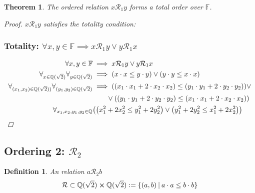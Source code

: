 \documentclass[]{article}
\newcommand{\Rel}{\mathcal{R}}
\newcommand{\N}{\mathbb{N}}
\newcommand{\Q}{\mathbb{Q}}
\newcommand{\st}{ \ \vline \ }
\newtheorem{definition}{Definition}
\newtheorem{theorem}{Theorem}
\begin{document}
\begin{theorem}
    The ordered relation $x \Rel_1 y$ forms a total order over $\mathbb{F}$.
    \begin{proof}
        $x \Rel_1 y$ satisfies the totality condition:
        \subsubsection{Totality: 
        $\forall x,y \in \mathbb{F} \implies x \Rel_1 y \lor y \Rel_1 x$}
        \begin{align*}
            \forall x,y \in \mathbb{F} &\implies x \Rel_1 y \lor y \Rel_1 x\\
            \forall_{x \in \Q(\sqrt{2})}
                    \forall_{y \in \Q(\sqrt{2})}
                &\implies \qty(x \cdot x \leq y \cdot y)
                    \lor \qty(y \cdot y \leq x \cdot x)\\
            \forall_{(x_1,x_2) \in \Q(\sqrt{2}))}
                    \forall_{(y_1,y_2) \in \Q(\sqrt{2})}
                &\implies \qty((x_1 \cdot x_1 + 2 \cdot x_2 \cdot x_2)
                    \leq (y_1 \cdot y_1 + 2 \cdot y_2 \cdot y_2)) \lor\\
                &\qquad \lor \qty((y_1 \cdot y_1 + 2 \cdot y_2 \cdot y_2)
                    \leq (x_1 \cdot x_1 + 2 \cdot x_2 \cdot x_2))\\
            \forall_{x_1, x_2, y_1, y_2 \in \Q}
                &\qty(\qty(x_1^2 + 2 x_2^2 \leq y_1^2 + 2 y_2^2)
                    \lor \qty(y_1^2 + 2 y_2^2 \leq x_1^2 + 2 x_2^2))\\
        \end{align*}
    \end{proof}
\end{theorem}

\subsection{Ordering 2: $\Rel_2$}
\begin{definition}
    An relation $a \Rel_2 b$
    $$\Rel \subset \Q(\sqrt{2}) \cross \Q(\sqrt{2}) 
        := \qty{(a,b) \st a \cdot a \leq b \cdot b}$$
\end{definition}
\end{document}
